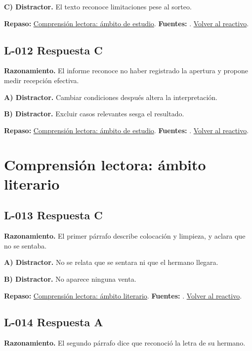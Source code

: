 \textbf{C) Distractor. }El texto reconoce limitaciones pese al sorteo.

\textbf{Repaso:} \hyperref[sec:l1]{Comprensión lectora: ámbito de estudio}. \textbf{Fuentes:} \cite{ceneval,reading}. \hyperref[q:L-011]{Volver al reactivo}.\par\medskip

\subsection*{L-012 \quad Respuesta C}\label{s:L-012}
\textbf{Razonamiento.} El informe reconoce no haber registrado la apertura y propone medir recepción efectiva.

\textbf{A) Distractor. }Cambiar condiciones después altera la interpretación.

\textbf{B) Distractor. }Excluir casos relevantes sesga el resultado.

\textbf{Repaso:} \hyperref[sec:l1]{Comprensión lectora: ámbito de estudio}. \textbf{Fuentes:} \cite{ceneval,reading}. \hyperref[q:L-012]{Volver al reactivo}.\par\medskip

\section{Comprensión lectora: ámbito literario}

\subsection*{L-013 \quad Respuesta C}\label{s:L-013}
\textbf{Razonamiento.} El primer párrafo describe colocación y limpieza, y aclara que no se sentaba.

\textbf{A) Distractor. }No se relata que se sentara ni que el hermano llegara.

\textbf{B) Distractor. }No aparece ninguna venta.

\textbf{Repaso:} \hyperref[sec:l2]{Comprensión lectora: ámbito literario}. \textbf{Fuentes:} \cite{ceneval,reading}. \hyperref[q:L-013]{Volver al reactivo}.\par\medskip

\subsection*{L-014 \quad Respuesta A}\label{s:L-014}
\textbf{Razonamiento.} El segundo párrafo dice que reconoció la letra de su hermano.

